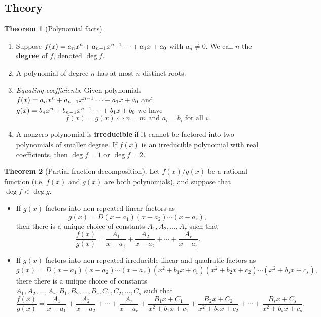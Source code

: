 \documentclass[11pt]{article}
\theoremstyle{definition}
\theoremstyle{named}
\newtheorem*{namedtheorem}{Theorem}
\numberwithin{myalgctr}{section}
\begin{document}
\thispagestyle{fancy}


 \subsection*{Theory}
 \begin{namedtheorem}[Polynomial facts]\
   \begin{enumerate}
     \item Suppose $f(x)=a_nx^n+a_{n-1}x^{n-1}\cdots +a_1x+a_0$ with $a_n\ne 0$. We call $n$ the {\bf degree} of $f$, denoted $\deg f$.
     \item A polynomial of degree $n$ has at most $n$ distinct roots.
     \item {\em Equating coefficients}. Given polynomials $f(x)=a_nx^n+a_{n-1}x^{n-1}\cdots +a_1x+a_0$ and $g(x)=b_{n}x^{n}+b_{n-1}x^{n-1}\cdots +b_1x+b_0$ we have
     \[
     f(x)=g(x) \iff n=m \text{ and } a_i=b_i \text{ for all $i$.}
     \]
     \item A nonzero polynomial is {\bf irreducible} if it cannot be factored into two polynomials of smaller degree. If $f(x)$ is an irreducible polynomial with real coefficients, then $\deg f=1$ or $\deg f=2$.
   \end{enumerate}

 \end{namedtheorem}
\begin{namedtheorem}[Partial fraction decomposition] Let $f(x)/g(x)$ be a rational function (i.e, $f(x)$ and $g(x)$ are both polynomials), and suppose that $\boxed{\deg f<\deg g}$.
\begin{itemize}
  \item If $g(x)$ factors into non-repeated linear factors as
  \[
  g(x)=D(x-a_1)(x-a_2)\cdots (x-a_r),
  \]
  then there is a unique choice of constants $A_1, A_2,\dots, A_r$ such that
  \[
  \frac{f(x)}{g(x)}=\frac{A_1}{x-a_1}+\frac{A_2}{x-a_2}+\cdots +\frac{A_r}{x-a_r}.
  \]
  \item If $g(x)$ factors into non-repeated irreducible linear and quadratic factors as
  \[
  g(x)=D(x-a_1)(x-a_2)\cdots (x-a_r)(x^2+b_1x+c_1)(x^2+b_2x+c_2)\cdots (x^2+b_sx+c_s),
  \]
  there there is a unique choice of constants $A_1,A_2,\dots, A_r, B_1,B_2,\dots, B_s, C_1, C_2,\dots, C_s$ such that
  \[
  \frac{f(x)}{g(x)}=\frac{A_1}{x-a_1}+\frac{A_2}{x-a_2}+\cdots +\frac{A_r}{x-a_r}+\frac{B_1x+C_1}{x^2+b_1x+c_1}+\frac{B_2x+C_2}{x^2+b_2x+c_2}+\cdots +\frac{B_sx+C_s}{x^2+b_sx+c_s}.
  \]
\end{itemize}
\end{namedtheorem}
\end{document}
